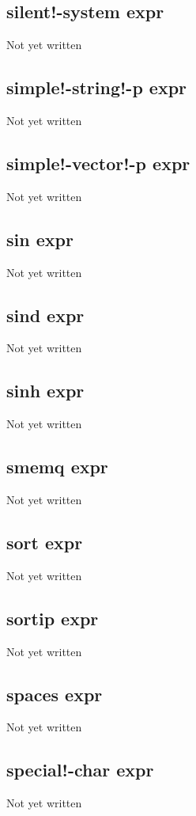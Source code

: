 \documentclass[a4paper,11pt]{article}
\begin{document}
\subsection{\ttfamily silent!-system expr}
Not yet written

\subsection{\ttfamily simple!-string!-p expr}
Not yet written

\subsection{\ttfamily simple!-vector!-p expr}
Not yet written

\subsection{\ttfamily sin expr}
Not yet written

\subsection{\ttfamily sind expr}
Not yet written

\subsection{\ttfamily sinh expr}
Not yet written

\subsection{\ttfamily smemq expr}
Not yet written

\subsection{\ttfamily sort expr}
Not yet written

\subsection{\ttfamily sortip expr}
Not yet written

\subsection{\ttfamily spaces expr}
Not yet written

\subsection{\ttfamily special!-char expr}
Not yet written
\end{document}
